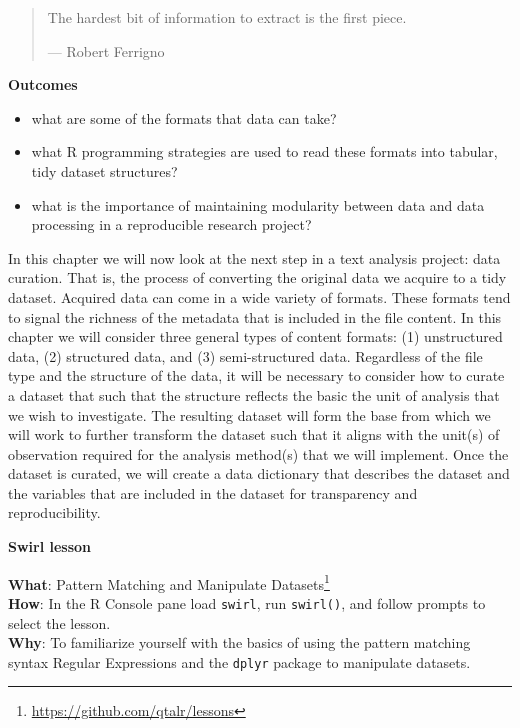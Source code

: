 \documentclass[
  letterpaper,
  DIV=11,
  numbers=noendperiod]{scrreport}
\providecommand{\tightlist}{%
  \setlength{\itemsep}{0pt}\setlength{\parskip}{0pt}}\usepackage{longtable,booktabs,array}
\theoremstyle{definition}
\theoremstyle{remark}
\DeclareRobustCommand{\href}[2]{#2\footnote{\url{#1}}}
\begin{document}
\begin{quote}
The hardest bit of information to extract is the first piece.

--- Robert Ferrigno
\end{quote}

\begin{tcolorbox}[enhanced jigsaw, opacityback=0, bottomrule=.15mm, left=2mm, breakable, colback=white, leftrule=.75mm, toprule=.15mm, rightrule=.15mm, arc=.35mm]

\textbf{ Outcomes}

\begin{itemize}
\tightlist
\item
  what are some of the formats that data can take?
\item
  what R programming strategies are used to read these formats into
  tabular, tidy dataset structures?
\item
  what is the importance of maintaining modularity between data and data
  processing in a reproducible research project?
\end{itemize}

\end{tcolorbox}

In this chapter we will now look at the next step in a text analysis
project: data curation. That is, the process of converting the original
data we acquire to a tidy dataset. Acquired data can come in a wide
variety of formats. These formats tend to signal the richness of the
metadata that is included in the file content. In this chapter we will
consider three general types of content formats: (1) unstructured data,
(2) structured data, and (3) semi-structured data. Regardless of the
file type and the structure of the data, it will be necessary to
consider how to curate a dataset that such that the structure reflects
the basic the unit of analysis that we wish to investigate. The
resulting dataset will form the base from which we will work to further
transform the dataset such that it aligns with the unit(s) of
observation required for the analysis method(s) that we will implement.
Once the dataset is curated, we will create a data dictionary that
describes the dataset and the variables that are included in the dataset
for transparency and reproducibility.

\begin{tcolorbox}[enhanced jigsaw, opacityback=0, bottomrule=.15mm, left=2mm, breakable, colback=white, leftrule=.75mm, toprule=.15mm, rightrule=.15mm, arc=.35mm]

\textbf{ Swirl lesson}

\textbf{What}: \href{https://github.com/qtalr/lessons}{Pattern Matching
and Manipulate Datasets}\\
\textbf{How}: In the R Console pane load \texttt{swirl}, run
\texttt{swirl()}, and follow prompts to select the lesson.\\
\textbf{Why}: To familiarize yourself with the basics of using the
pattern matching syntax Regular Expressions and the \texttt{dplyr}
package to manipulate datasets.

\end{tcolorbox}
\end{document}
